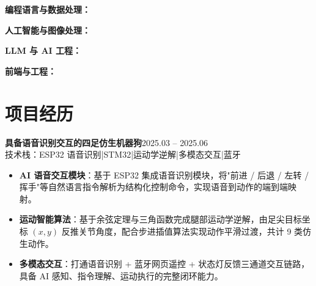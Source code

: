 \documentclass[10pt,a4paper]{article}
\newcommand{\projectblock}[3]{%
    {\bfseries\color{darktext}#1}\hfill{\color{graytext}#2}\\%
    {\small\color{graytext}#3}%
    \vspace{0.2em}%
}
\begin{document}
{\bfseries\color{primary}编程语言与数据处理：}

\vspace{2pt}

{\bfseries\color{primary}人工智能与图像处理：}

\vspace{2pt}

{\bfseries\color{primary}LLM 与 AI 工程：}

\vspace{2pt}

{\bfseries\color{primary}前端与工程：}

\section{\faProjectDiagram\hspace{0.4em}项目经历}

\projectblock{具备语音识别交互的四足仿生机器狗}{2025.03 -- 2025.06}{技术栈：ESP32 语音识别\hspace{0.3em}|\hspace{0.3em}STM32\hspace{0.3em}|\hspace{0.3em}运动学逆解\hspace{0.3em}|\hspace{0.3em}多模态交互\hspace{0.3em}|\hspace{0.3em}蓝牙}

\begin{itemize}[leftmargin=1.5em, itemsep=2pt, parsep=0pt, topsep=2pt]
    \item \textbf{AI 语音交互模块}：基于 ESP32 集成语音识别模块，将"前进 / 后退 / 左转 / 挥手"等自然语言指令解析为结构化控制命令，实现语音到动作的端到端映射。
    \item \textbf{运动智能算法}：基于余弦定理与三角函数完成腿部运动学逆解，由足尖目标坐标 $(x,y)$ 反推关节角度，配合步进插值算法实现动作平滑过渡，共计 9 类仿生动作。
    \item \textbf{多模态交互}：打通语音识别 + 蓝牙网页遥控 + 状态灯反馈三通道交互链路，具备 AI 感知、指令理解、运动执行的完整闭环能力。
\end{itemize}
\end{document}

